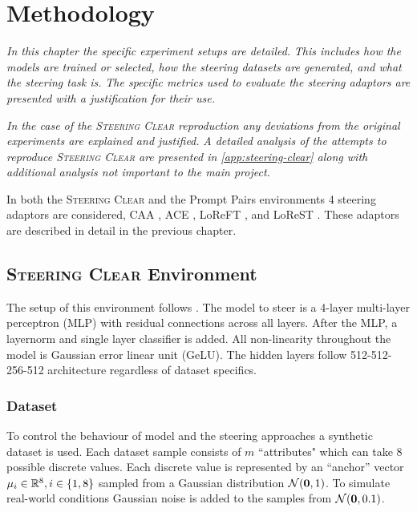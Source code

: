 \chapter{Methodology}
\label{ch:methodology}

\emph{In this chapter the specific experiment setups are detailed.}
\emph{This includes how the models are trained or selected, how the steering datasets are generated, and what the steering task is.}
\emph{The specific metrics used to evaluate the steering adaptors are presented with a justification for their use.}

\emph{In the case of the {\scshape Steering Clear} \citep{steering-clear} reproduction any deviations from the original experiments are explained and justified.}
\emph{A detailed analysis of the attempts to reproduce {\scshape Steering Clear} are presented in \cref{app:steering-clear} along with additional analysis not important to the main project.}

In both the {\scshape Steering Clear} and the Prompt Pairs environments 4 steering adaptors are considered, CAA \citep{caa}, ACE \citep{ace}, LoReFT \citep{reft}, and LoReST \citep{steering-clear}.
These adaptors are described in detail in the previous chapter.

\section{{\scshape Steering Clear} Environment}
\label{sec:steering-clear}

The setup of this environment follows \citep{steering-clear}.
The model to steer is a 4-layer multi-layer perceptron (MLP) with residual connections \citep{resnet} across all layers.
After the MLP, a layernorm \citep{layernorm} and single layer classifier is added.
All non-linearity throughout the model is Gaussian error linear unit (GeLU).
The hidden layers follow 512-512-256-512 architecture regardless of dataset specifics.

\subsection{Dataset}
\label{steering-clear:dataset}

To control the behaviour of model and the steering approaches a synthetic dataset is used.
Each dataset sample consists of $m$ ``attributes" which can take 8 possible discrete values.
Each discrete value is represented by an ``anchor'' vector $\mathbf{\mu}_i \in \mathbb{R}^8, i \in \{1,8\}$ sampled from a Gaussian distribution $\mathcal{N}(\mathbf{0}, 1)$.
To simulate real-world conditions Gaussian noise is added to the samples from $\mathcal{N}(\mathbf{0}, 0.1)$.


